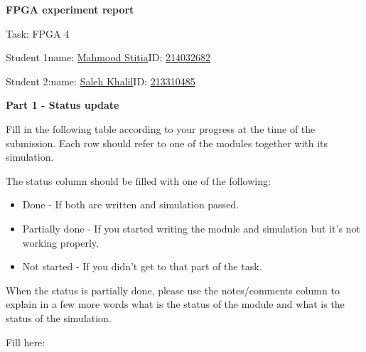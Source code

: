 \documentclass[11pt,a4paper]{article}
\begin{document}
\begin{center}
  {\fontsize{22}{26}\selectfont \textbf{FPGA experiment report}}
\end{center}

\vspace{0.5em}
Task: FPGA 4

\vspace{1em}
Student 1\hspace{1.5em}name: \underline{Mahmood Stitia}\hspace{2em}ID: \underline{214032682}

Student 2:\hspace{1.5em}name: \underline{Saleh Khalil}\hspace{3.2em}ID: \underline{213310485}

\vspace{1.5em}

{\fontsize{14}{17}\selectfont \textbf{Part 1 - Status update}}

\vspace{0.5em}
Fill in the following table according to your progress at the time of the submission.
Each row should refer to one of the modules together with its simulation.

The status column should be filled with one of the following:
\begin{itemize}[noitemsep,topsep=2pt]
  \item Done - If both are written and simulation passed.
  \item Partially done - If you started writing the module and simulation but it's not working properly.
  \item Not started - If you didn't get to that part of the task.
\end{itemize}

When the status is partially done, please use the notes/comments column to explain in a few more words what is the status of the module and what is the status of the simulation.

\vspace{0.5em}
Fill here:
\end{document}
